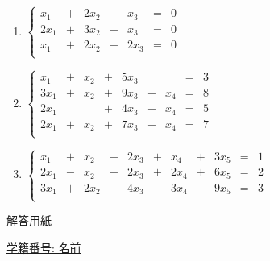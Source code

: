 \documentclass[dvipdfmx,a4paper,11pt]{article}
\theoremstyle{definition}
\begin{document}
 \begin{enumerate}
    \setlength{\parskip}{0cm} %
  \setlength{\itemsep}{0cm} %
  \item  $
 \left\{ 
\begin{matrix}
x_1& + &  2x_2&  +& x_3&  = & 0 \\
2x_1& + & 3x_2&  +& x_3&  = & 0 \\
 x_1& + & 2x_2&  +& 2x_3&  = & 0 \\
\end{matrix}
\right.
 $
   \item  $
 \left\{ 
\begin{matrix}
x_1& + &  x_2&  +& 5x_3&  && = & 3 \\
3x_1& + &  x_2&  +& 9x_3& + &x_4& = & 8 \\
2x_1&  &  &  +& 4x_3& + &x_4& = & 5 \\
2x_1& + &  x_2&  +& 7x_3& + &x_4& = & 7 \\
\end{matrix}
\right.
 $
    \item  $
 \left\{ 
\begin{array}{ccccccccccc}
x_1& +& x_2&  -&2x_3	&+&x_4& +&3x_5&=& 1\\
2x_1&-&x_2& + &2x_3&+&2x_4&+&6x_5&= &2 \\
3x_1&+&2x_2& - &4x_3& - &  3x_4  &-&9x_5&= &3\\
\end{array}
\right.
 $
\end{enumerate}

 \newpage
 
  \begin{center}
 {\Large 解答用紙}
\end{center}


\begin{flushleft}
{ \large \underline{学籍番号: \hspace{4cm} 名前  \hspace{9cm}   }  }
\end{flushleft}
 

 
\end{document}

